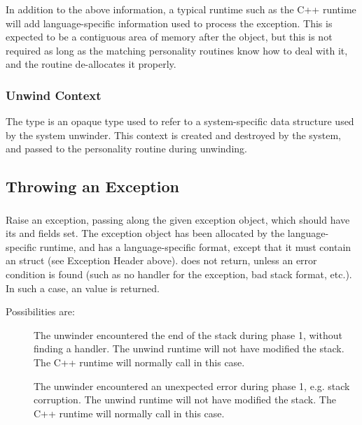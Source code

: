 In addition to the above information, a typical runtime such as the
C++ runtime will add language-specific information used to process the
exception.  This is expected to be a contiguous area of memory after
the  object, but this is not required as
long as the matching personality routines know how to deal with it,
and the  routine de-allocates it properly.

\subsubsection{Unwind Context}

The  type is an opaque type used to refer to a
system-specific data structure used by the system unwinder.  This context
is created and destroyed by the system, and passed to the personality
routine during unwinding.


\subsection{Throwing an Exception}

\subsubsection{}


Raise an exception, passing along the given exception object,
which should have its  and  fields
set. The exception object has been allocated by the language-specific
runtime, and has a language-specific format, except that it must
contain an  struct (see Exception Header above).
 does not return, unless an error condition is
found (such as no handler for the exception, bad stack format, etc.).
In such a case, an  value is returned.

Possibilities are:
\begin{description}
\item[] The unwinder encountered the end of the
   stack during phase 1, without finding a handler. The unwind runtime
   will not have modified the stack. The C++ runtime will normally call
    in this case.
\item[] The unwinder encountered an unexpected
   error during phase 1, e.g. stack corruption. The unwind runtime will
   not have modified the stack. The C++ runtime will normally call
    in this case.
\end{description}

